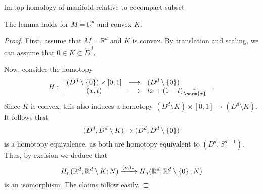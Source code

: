 \begin{refproof}{lm:top-homology-of-manifold-relative-to-cocompact-subset}
  \begin{claim}
    The lemma holds for $M = \mathbb{R}^d$ and convex $K$.
  \end{claim}
  \begin{proof}
    First, assume that $M = \mathbb{R}^d$ and $K$ is convex.
    By translation and scaling, we can assume that
    $0\in K\subset \mathring{D}^d$.

    Now, consider the homotopy
      \begin{equation*}
      H: \left| \begin{array}{c c l} 
        (D^d \setminus \set{ 0 } ) \times [0,1]
        & \longrightarrow &
        (D^d \setminus \set{ 0 } ) \\
        (x,t) & \longmapsto &  tx + (1-t) \frac{x}{\norm{x}}
      \end{array} \right.
      .
    \end{equation*}
    Since $K$ is convex, this also induces a homotopy
    $(D^d \setminus K) \times [0,1] \to  (D^d \setminus K)$.
    It follows that
    \[
      (D^d, D^d \setminus K) \to (D^d, D^d \setminus \left\{  0  \right\} )
    \]
    is a homotopy equivalence,
    as both are homotopy equivalent to $(D^d, S^{d-1})$.
    Thus, by excision we deduce that
    \[
      H_n(\mathbb{R}^d, \mathbb{R}^d \setminus K;N)
      \xrightarrow{(i_0)_*} 
      H_n(\mathbb{R}^d, \mathbb{R}^d \setminus \left\{  0  \right\} ;N)
    \]
    is an isomorphism.
    The claims follow easily.
  \end{proof}
\end{refproof}
